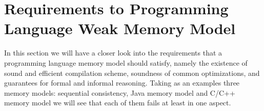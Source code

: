 \documentclass[a4paper,twoside,11pt]{article}
\numberwithin{equation}{section}
\begin{document}








\section{Requirements to Programming Language Weak Memory Model}

In this section we will have a closer look into the requirements 
that a programming language memory model should satisfy, 
namely the existence of sound and efficient compilation scheme, 
soundness of common optimizations, and guarantees for formal and informal reasoning.  
Taking as an examples three memory models: 
sequential consistency, Java memory model and C/C++ memory model
we will see that each of them fails at least in one aspect.
\end{document}

